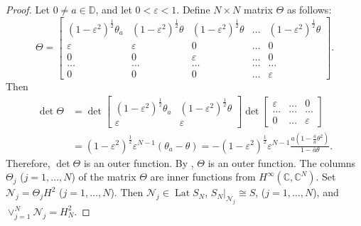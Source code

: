 \documentclass[a4paper,oneside,11pt]{amsart}
\numberwithin{equation}{section}
\theoremstyle{plain}
\theoremstyle{definition}
\begin{document}
\begin{proof} Let $0\neq a\in\mathbb D$, and let $0<\varepsilon<1$. Define $N\times N$ matrix $\Theta$ as follows:  
\begin{equation*} \Theta=\left[\begin{matrix}
(1-\varepsilon^2)^{\frac{1}{2}}\theta_a & (1-\varepsilon^2)^{\frac{1}{2}}\theta & 
(1-\varepsilon^2)^{\frac{1}{2}}\theta &\ldots & (1-\varepsilon^2)^{\frac{1}{2}}\theta \\
\varepsilon & \varepsilon & 0 & \ldots & 0 \\ 
0 & 0 &  \varepsilon & \ldots & 0 \\  \ldots &  \ldots &  \ldots &   \ldots &  \ldots \\ 
0 & 0 & 0 &  \ldots &  \varepsilon \end{matrix}\right].
\end{equation*}
Then 
\begin{align*} \det \Theta &=\det  \left[\begin{matrix}(1-\varepsilon^2)^{\frac{1}{2}}\theta_a & (1-\varepsilon^2)^{\frac{1}{2}}\theta \\
\varepsilon & \varepsilon\end{matrix}\right]
\det\left[\begin{matrix}\varepsilon & \ldots & 0 \\   \ldots &   \ldots &  \ldots \\ 
 0 &  \ldots &  \varepsilon\end{matrix}\right] \\ &
= (1-\varepsilon^2)^{\frac{1}{2}}\varepsilon^{N-1}(\theta_a-\theta)=-(1-\varepsilon^2)^{\frac{1}{2}}\varepsilon^{N-1}
\frac{a(1-\frac{\overline a}{a}\theta^2)}{1-\overline a \theta}.
\end{align*} 
Therefore, $\det\Theta$  is an outer function. By {\cite[Prop. V.6.1 and Theorem V.6.2]{nfbk}}, $\Theta$ is an outer function. 
The columns $\Theta_j$ ($j=1,\ldots, N$) of the matrix $\Theta$ are inner functions from $H^\infty(\mathbb C, \mathbb C^N)$. 
Set $\mathcal N_j=\Theta_j H^2$ ($j=1,\ldots, N$). Then $\mathcal N_j\in\operatorname{Lat}S_N$, 
$S_N|_{\mathcal N_j}\cong S$,  ($j=1,\ldots, N$), 
and $\vee_{j=1}^N\mathcal N_j=H^2_N$.


\end{proof}
\end{document}
